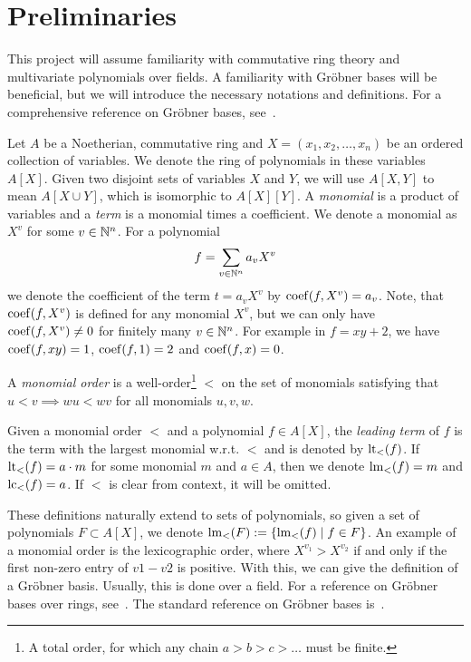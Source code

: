 \section{Preliminaries}
This project will assume familiarity with commutative ring theory and multivariate polynomials over fields. A familiarity with Gröbner bases will be beneficial, but we will introduce the necessary notations and definitions. For a comprehensive reference on Gröbner bases, see~\cite{IVA}.

Let $A$ be a Noetherian, commutative ring and $X = (x_{1}, x_{2}, \dots, x_{n})$ be an ordered collection of variables. We denote the ring of polynomials in these variables $A[X]$. Given two disjoint sets of variables $X$ and $Y$, we will use $A[X, Y]$ to mean $A[X \cup Y]$, which is isomorphic to $A[X][Y]$. A \textit{monomial} is a product of variables and a \textit{term} is a monomial times a coefficient. We denote a monomial as $X^{v}$ for some $v \in \mathbb{N}^{n}$. For a polynomial \[f = \sum_{v \in \mathbb{N}^{n}} a_{v}X^{v}\] we denote the coefficient of the term $t = a_{v}X^{v}$ by $\operatorname{coef}(f, X^{v}) = a_{v}$. Note, that $\operatorname{coef}(f, X^{v})$ is defined for any monomial $X^{v}$, but we can only have $\operatorname{coef}(f, X^{v}) \neq 0$ for finitely many $v \in \mathbb{N}^{n}$. For example in $f = xy + 2$, we have $\operatorname{coef}(f, xy) = 1$, $\operatorname{coef}(f, 1) = 2$ and $\operatorname{coef}(f, x) = 0$.

\begin{definition}
  A \textit{monomial order} is a well-order\footnote{A total order, for which any chain $a > b > c > \dots$ must be finite.} $<$ on the set of monomials satisfying that $u < v \implies wu < wv$ for all monomials $u, v, w$.

  Given a monomial order $<$ and a polynomial $f \in A[X]$, the \textit{leading term} of $f$ is the term with the largest monomial w.r.t. $<$ and is denoted by $\operatorname{lt}_{<}(f)$. If $\operatorname{lt}_{<}(f) = a\cdot m$ for some monomial $m$ and $a \in A$, then we denote $\operatorname{lm}_{<}(f) = m$ and $\operatorname{lc}_{<}(f) = a$. If $<$ is clear from context, it will be omitted.
\end{definition}

These definitions naturally extend to sets of polynomials, so given a set of polynomials $F \subset A[X]$, we denote $\operatorname{lm}_{<}(F) := \{\operatorname{lm}_{<}(f) \mid f \in F\}$. An example of a monomial order is the lexicographic order, where $X^{v_{1}} > X^{v_{2}}$ if and only if the first non-zero entry of $v1 - v2$ is positive. With this, we can give the definition of a Gröbner basis. Usually, this is done over a field. For a reference on Gröbner bases over rings, see~\cite{loustaunau1994introduction}. The standard reference on Gröbner bases is~\cite{IVA}.

